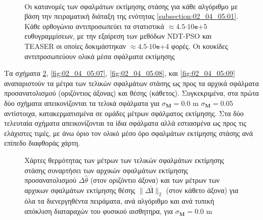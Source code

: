 \begin{figure}[!h]\centering\vspace{2cm}
  \begin{subfigure}{\linewidth}\hspace{-1cm}
    
  \end{subfigure}\\\vspace{3cm}%
  \begin{subfigure}{\linewidth}\hspace{-1cm}
    
  \end{subfigure}%
  \vspace{1cm}
\caption{\small Οι κατανομές των σφαλμάτων εκτίμησης στάσης για κάθε αλγόριθμο
         με βάση την πειραματική διάταξη της ενότητας
         \ref{subsection:02_04_05:01}. Κάθε ορθογώνιο αντιπροσωπεύει τα
         στατιστικά $\approx 4.5$$\cdot$$10\texttt{e}$$+$$5$ ευθυγραμμίσεων, με
         την εξαίρεση των μεθόδων NDT-PSO και TEASER οι οποίες δοκιμάστηκαν
         $\approx 4.5$$\cdot$$10\texttt{e}$$+$$4$ φορές. Οι κουκίδες
         αντιπροσωπεύουν ολικά μέσα σφάλματα εκτίμησης}
\label{fig:02_04_05:05}
\end{figure}


Τα σχήματα \ref{fig:02_04_05:06}, \ref{fig:02_04_05:07}, \ref{fig:02_04_05:08},
και \ref{fig:02_04_05:09} αναπαριστούν τα μέτρα των τελικών σφαλμάτων στάσης ως
προς τα αρχικά σφάλματα προσανατολισμού (οριζόντιος άξονας) και θέσης
(κάθετος). Συγκεκριμένα, στα πρώτα δύο σχήματα απεικονίζονται τα τελικά
σφάλματα για $\sigma_{\bm{M}} = 0.0$ m $\sigma_{\bm{M}} = 0.05$ αντίστοιχα,
κατακερματισμένα σε ομάδες μέτρων σφάλματος εκτίμησης. Στα δύο τελευταία
σχήματα απεικονίζονται τα ίδια σφάλματα αλλά εστιασμένα ως προς τις ελάχιστες
τιμές, με άνω όριο τον ολικό μέσο όρο σφαλμάτων εκτίμησης στάσης ανά επίπεδο
διαφθοράς χάρτη.


\begin{figure}[!h]\vspace{1cm}\hspace{0.5cm}
  
  \vspace{1cm}
  \caption{\small Χάρτες θερμότητας των μέτρων των τελικών σφαλμάτων εκτίμησης
           στάσης συναρτήσει των αρχικών σφαλμάτων εκτίμησης προσανατολισμού
           $\Delta\hat{\theta}$ (στον οριζόντιο άξονα) και των μέτρων των
           αρχικων σφαλμάτων εκτίμησης θέσης $\|\Delta \hat{\bm{l}}\|_2$ (στον
           κάθετο άξονα) για όλα τα διενεργηθέντα πειράματα, ανά αλγόριθμο και
           ανά τυπική απόκλιση διαταραχών του φυσικού αισθητηρα, για
           $\sigma_{\bm{M}} = 0.0$ m}
  \label{fig:02_04_05:06}
\end{figure}

